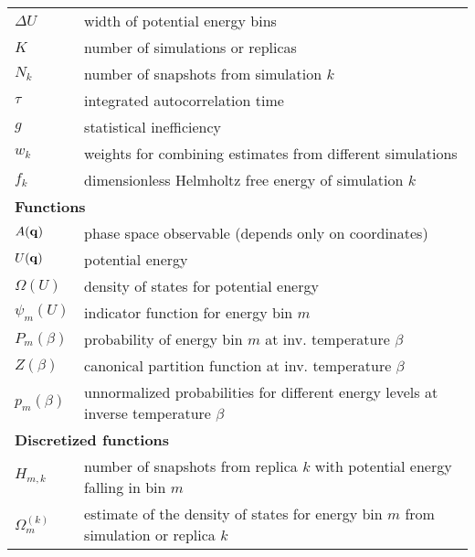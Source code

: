 \begin{table*}[p]
\begin{tabular}{ll}
$\Delta U$ & width of potential energy bins \\
$K$ & number of simulations or replicas \\
$N_k$ & number of snapshots from simulation $k$ \\
$\tau$ & integrated autocorrelation time \\
$g$ & statistical inefficiency \\
$w_k$ & weights for combining estimates from different simulations \\
$f_k$ & dimensionless Helmholtz free energy of simulation $k$ \\
\multicolumn{2}{l}{\bf Functions} \\
$A({\bf q})$ & phase space observable (depends only on coordinates) \\
$U({\bf q})$ & potential energy \\
$\Omega(U)$ & density of states for potential energy \\
$\psi_m(U)$ & indicator function for energy bin $m$ \\
$P_m(\beta)$ & probability of energy bin $m$ at inv. temperature $\beta$ \\
$Z(\beta)$ & canonical partition function at inv. temperature $\beta$ \\
$p_m(\beta)$ & unnormalized probabilities for different energy levels at inverse temperature $\beta$ \\
\multicolumn{2}{l}{\bf Discretized functions} \\
$H_{m,k}$ & number of snapshots from replica $k$ with potential energy falling in bin $m$ \\
$\Omega_{m}^{(k)}$ & estimate of the density of states for energy bin $m$ from simulation or replica $k$ \\
\hline
\end{tabular}
\end{table*}